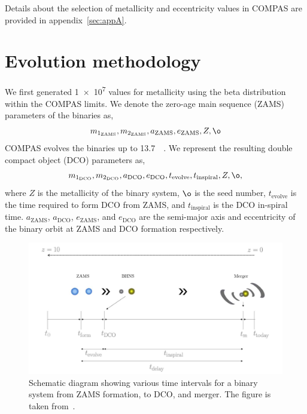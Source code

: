 \documentclass[journal, twocolumn]{IEEEtran}
\newcommand{\mone}[1]{m_{1_{\text{#1}}}}
\newcommand{\mtwo}[1]{m_{2_{\text{#1}}}}
\newcommand{\semaxis}[1]{a_{\text{#1}}}
\newcommand{\ecc}[1]{e_\text{#1}}
\newcommand{\interval}[1]{t_\text{#1}}
\begin{document}
    Details about the selection of metallicity and eccentricity values in COMPAS are provided in appendix~\ref{sec:appA}.


    \section{Evolution methodology}
    \label{sec:evolution-methodology}
    We first generated \num{1e7} values for metallicity using the beta distribution within the COMPAS limits.
    We denote the zero-age main sequence (ZAMS) parameters of the binaries as,
    \begin{equation}%
        \mone{ZAMS}, \mtwo{ZAMS}, \semaxis{ZAMS}, \ecc{ZAMS}, Z, \o
        \label{eq:zams_parameter_names}
    \end{equation}%
    COMPAS evolves the binaries up to \SI{13.7}{\giga\yr}.
    We represent the resulting double compact object (DCO) parameters as,
    \begin{equation}%
        \mone{DCO}, \mtwo{DCO}, \semaxis{DCO}, \ecc{DCO}, \interval{evolve}, \interval{inspiral}, Z, \o,
        \label{eq:dco_parameter_names}
    \end{equation}%
    where $Z$ is the metallicity of the binary system, $\o$ is the seed number, $\interval{evolve}$ is the time required to form DCO from ZAMS, and $\interval{inspiral}$ is the DCO in-spiral time. $\semaxis{ZAMS}$, $\semaxis{DCO}$, $\ecc{ZAMS}$, and $\ecc{DCO}$ are the semi-major axis and eccentricity of the binary orbit at ZAMS and DCO formation respectively.
    \begin{figure}[!ht]%
        \centering%
        \includegraphics[width=\linewidth]{images/binary_evolution}%
        \caption{Schematic diagram showing various time intervals for a binary system from ZAMS formation, to DCO, and merger. The figure is taken from~\cite{Riley2022}.}%
        \label{fig:binaryevolution}%
    \end{figure}%
\end{document}

